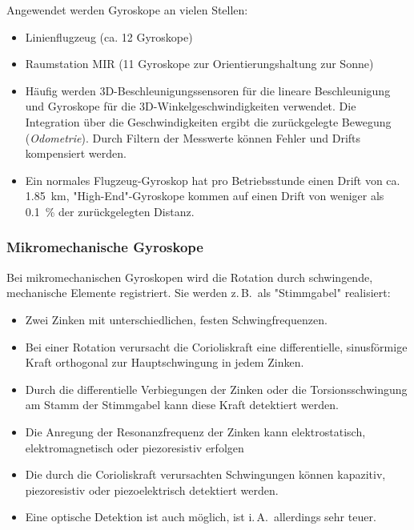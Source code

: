 \documentclass[a4paper, 11pt, accentcolor = tud3b]{tudreport}
\newcommand{\zB}{z.\,B.~}
\newcommand{\iA}{i.\,A.~}
\begin{document}
					Angewendet werden Gyroskope an vielen Stellen:
					\begin{itemize}
						\item Linienflugzeug (ca. \num{12} Gyroskope)
						\item Raumstation MIR (\num{11} Gyroskope zur Orientierungshaltung zur Sonne)
						\item Häufig werden 3D-Beschleunigungssensoren für die lineare Beschleunigung und Gyroskope für die 3D-Winkelgeschwindigkeiten verwendet. Die Integration über die Geschwindigkeiten ergibt die zurückgelegte Bewegung (\emph{Odometrie}). Durch Filtern der Messwerte können Fehler und Drifts kompensiert werden.
						\item Ein normales Flugzeug-Gyroskop hat pro Betriebsstunde einen Drift von ca. \SI{1.85}{\kilo\meter}, "High-End"-Gyroskope kommen auf einen Drift von weniger als \SI{0.1}{\percent} der zurückgelegten Distanz.
					\end{itemize}

				\subsubsection{Mikromechanische Gyroskope}
					Bei mikromechanischen Gyroskopen wird die Rotation durch schwingende, mechanische Elemente registriert. Sie werden \zB als "Stimmgabel" realisiert:
					\begin{itemize}
						\item Zwei Zinken mit unterschiedlichen, festen Schwingfrequenzen.
						\item Bei einer Rotation verursacht die Corioliskraft eine differentielle, sinusförmige Kraft orthogonal zur Hauptschwingung in jedem Zinken.
						\item Durch die differentielle Verbiegungen der Zinken oder die Torsionsschwingung am Stamm der Stimmgabel kann diese Kraft detektiert werden.
						\item Die Anregung der Resonanzfrequenz der Zinken kann elektrostatisch, elektromagnetisch oder piezoresistiv erfolgen
						\item Die durch die Corioliskraft verursachten Schwingungen können kapazitiv, piezoresistiv oder piezoelektrisch detektiert werden.
						\item Eine optische Detektion ist auch möglich, ist \iA allerdings sehr teuer.
					\end{itemize}
\end{document}
